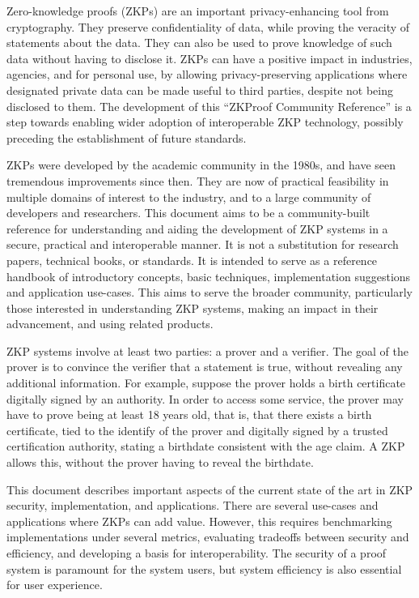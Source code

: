 \label{sec:prelim:executive-summary}

Zero-knowledge proofs (ZKPs) are an important privacy-enhancing tool from cryptography. 
They preserve confidentiality of data, while proving the veracity of statements about the data. %
They can also be used to prove knowledge of such data without having to disclose it. %
    ZKPs can have a positive impact in industries, agencies, and for personal use, 
by allowing privacy-preserving applications where designated private data
can be made useful to third parties, despite not being disclosed to them.
	The development of this ``ZKProof Community Reference'' is a step towards enabling wider 
adoption of interoperable ZKP technology, possibly preceding the establishment of future standards.


    ZKPs were developed by the academic community in the 1980s, and have seen tremendous improvements since then.
	They are now of practical feasibility in multiple domains of interest to the industry, and to a large community of developers and researchers.  
	This document aims to be a community-built reference for understanding and aiding the development of ZKP systems in a secure, practical and interoperable manner.
	It is not a substitution for research papers, technical books, or standards. It is intended to 
serve as a reference handbook of introductory concepts, basic techniques, implementation suggestions and application use-cases. 
	This aims to serve the broader community, particularly those interested in understanding ZKP systems, making an impact in their advancement, and using related products.


	ZKP systems involve at least two parties: a prover and a verifier.  
	The goal of the prover is to convince the verifier that a statement is true, without revealing any additional information.  
	For example, suppose the prover holds a birth certificate digitally signed by an authority.
	In order to access some service, the prover may have to prove being at least 18 years old, that is, that there exists a birth certificate, tied to the identify of the prover and digitally signed by a trusted certification authority, stating a birthdate consistent with the age claim.
	A ZKP allows this, without the prover having to reveal the birthdate.


	This document describes important aspects of the current state of the art in ZKP security, implementation, and applications.
	There are several use-cases and applications where ZKPs can add value.
	However, this requires benchmarking implementations under several metrics, evaluating tradeoffs between security and efficiency, and developing a basis for interoperability.
    The security of a proof system is paramount for the system users, but system efficiency is also essential for user experience.
\loosen


